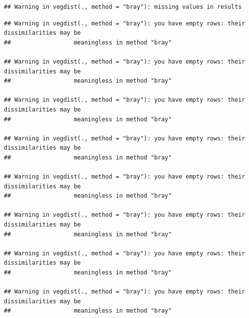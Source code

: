 \documentclass[
]{article}
\newenvironment{Shaded}{\begin{snugshade}}{\end{snugshade}}
\newcommand{\AttributeTok}[1]{\textcolor[rgb]{0.77,0.63,0.00}{#1}}
\newcommand{\DecValTok}[1]{\textcolor[rgb]{0.00,0.00,0.81}{#1}}
\newcommand{\FunctionTok}[1]{\textcolor[rgb]{0.00,0.00,0.00}{#1}}
\newcommand{\NormalTok}[1]{#1}
\newcommand{\SpecialCharTok}[1]{\textcolor[rgb]{0.00,0.00,0.00}{#1}}
\begin{document}
\begin{verbatim}
## Warning in vegdist(., method = "bray"): missing values in results
\end{verbatim}

\begin{verbatim}
## Warning in vegdist(., method = "bray"): you have empty rows: their dissimilarities may be
##                  meaningless in method "bray"

## Warning in vegdist(., method = "bray"): you have empty rows: their dissimilarities may be
##                  meaningless in method "bray"

## Warning in vegdist(., method = "bray"): you have empty rows: their dissimilarities may be
##                  meaningless in method "bray"

## Warning in vegdist(., method = "bray"): you have empty rows: their dissimilarities may be
##                  meaningless in method "bray"

## Warning in vegdist(., method = "bray"): you have empty rows: their dissimilarities may be
##                  meaningless in method "bray"

## Warning in vegdist(., method = "bray"): you have empty rows: their dissimilarities may be
##                  meaningless in method "bray"

## Warning in vegdist(., method = "bray"): you have empty rows: their dissimilarities may be
##                  meaningless in method "bray"

## Warning in vegdist(., method = "bray"): you have empty rows: their dissimilarities may be
##                  meaningless in method "bray"
\end{verbatim}

\begin{Shaded}
\end{Shaded}
\end{document}
